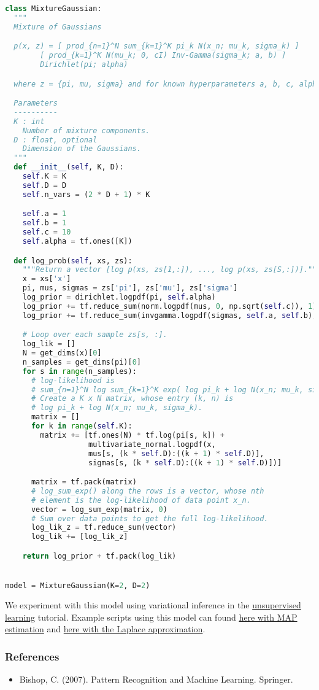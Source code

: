 \begin{lstlisting}[language=Python]
class MixtureGaussian:
  """
  Mixture of Gaussians

  p(x, z) = [ prod_{n=1}^N sum_{k=1}^K pi_k N(x_n; mu_k, sigma_k) ]
        [ prod_{k=1}^K N(mu_k; 0, cI) Inv-Gamma(sigma_k; a, b) ]
        Dirichlet(pi; alpha)

  where z = {pi, mu, sigma} and for known hyperparameters a, b, c, alpha.

  Parameters
  ----------
  K : int
    Number of mixture components.
  D : float, optional
    Dimension of the Gaussians.
  """
  def __init__(self, K, D):
    self.K = K
    self.D = D
    self.n_vars = (2 * D + 1) * K

    self.a = 1
    self.b = 1
    self.c = 10
    self.alpha = tf.ones([K])

  def log_prob(self, xs, zs):
    """Return a vector [log p(xs, zs[1,:]), ..., log p(xs, zs[S,:])]."""
    x = xs['x']
    pi, mus, sigmas = zs['pi'], zs['mu'], zs['sigma']
    log_prior = dirichlet.logpdf(pi, self.alpha)
    log_prior += tf.reduce_sum(norm.logpdf(mus, 0, np.sqrt(self.c)), 1)
    log_prior += tf.reduce_sum(invgamma.logpdf(sigmas, self.a, self.b), 1)

    # Loop over each sample zs[s, :].
    log_lik = []
    N = get_dims(x)[0]
    n_samples = get_dims(pi)[0]
    for s in range(n_samples):
      # log-likelihood is
      # sum_{n=1}^N log sum_{k=1}^K exp( log pi_k + log N(x_n; mu_k, sigma_k) )
      # Create a K x N matrix, whose entry (k, n) is
      # log pi_k + log N(x_n; mu_k, sigma_k).
      matrix = []
      for k in range(self.K):
        matrix += [tf.ones(N) * tf.log(pi[s, k]) +
                   multivariate_normal.logpdf(x,
                   mus[s, (k * self.D):((k + 1) * self.D)],
                   sigmas[s, (k * self.D):((k + 1) * self.D)])]

      matrix = tf.pack(matrix)
      # log_sum_exp() along the rows is a vector, whose nth
      # element is the log-likelihood of data point x_n.
      vector = log_sum_exp(matrix, 0)
      # Sum over data points to get the full log-likelihood.
      log_lik_z = tf.reduce_sum(vector)
      log_lik += [log_lik_z]

    return log_prior + tf.pack(log_lik)


model = MixtureGaussian(K=2, D=2)
\end{lstlisting}

We experiment with this model using variational inference in the
\href{tut_unsupervised}{unsupervised learning} tutorial.
Example scripts using this model can found
\href{https://github.com/blei-lab/edward/blob/master/examples/mixture_gaussian_map.py}
{here with MAP estimation} and
\href{https://github.com/blei-lab/edward/blob/master/examples/mixture_gaussian_laplace.py}
{here with the Laplace approximation}.

\subsubsection{References}\label{references}

\begin{itemize}
\item
  Bishop, C. (2007). Pattern Recognition and Machine Learning. Springer.
\end{itemize}
